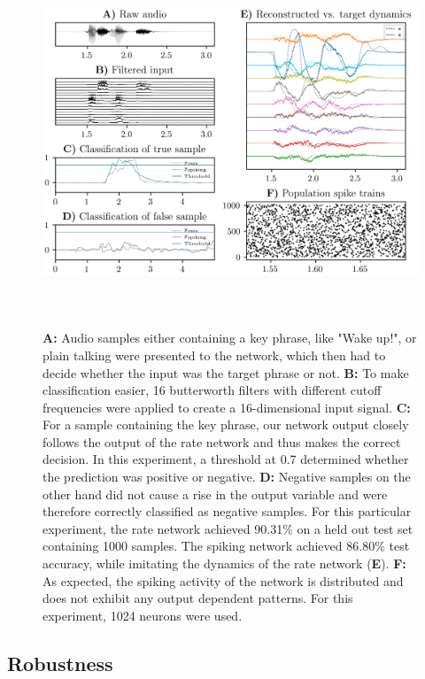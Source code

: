 \documentclass[twoside,11pt,titlepage]{article}
\begin{document}
\begin{figure}[!htb]
  \includegraphics[width = \columnwidth, height=11cm]{figures/figure3.png}
  \caption{\textbf{A:} Audio samples either containing a key phrase, like "Wake up!", or plain talking were
  presented to the network, which then had to decide whether the input was the target phrase or not.
  \textbf{B:} To make classification easier, 16 butterworth filters with different cutoff frequencies
  were applied to create a 16-dimensional input signal. \textbf{C:} For a sample containing the key phrase,
  our network output closely follows the output of the rate network and thus makes the correct decision. In this experiment,
  a threshold at 0.7 determined whether the prediction was positive or negative. \textbf{D:} Negative samples on the other hand
  did not cause a rise in the output variable and were therefore correctly classified as negative samples. For this particular experiment,
  the rate network achieved 90.31\% on a held out test set containing 1000 samples. The spiking network achieved 86.80\% test accuracy,
  while imitating the dynamics of the rate network (\textbf{E}). \textbf{F:} As expected, the spiking activity of the
  network is distributed and does not exhibit any output dependent patterns.
  For this experiment, 1024 neurons were used.}
  \label{fig:figure3}
\end{figure}

\clearpage

\subsection{Robustness}
\end{document}
